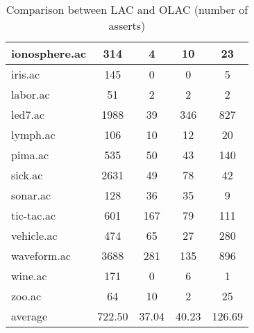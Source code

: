 \begin{table}[htbp]
\begin{tabular}{|l|c|c|c|c|}
		\hline
		ionosphere.ac   & 314           & 4                  & 10                       & 23                            \\
		\hline
		iris.ac         & 145           & 0                  & 0                        & 5                             \\
		\hline
		labor.ac        & 51            & 2                  & 2                        & 2                             \\
		\hline
		led7.ac         & 1988          & 39                 & 346                      & 827                           \\
		\hline
		lymph.ac        & 106           & 10                 & 12                       & 20                            \\
		\hline
		pima.ac         & 535           & 50                 & 43                       & 140                           \\
		\hline
		sick.ac         & 2631          & 49                 & 78                       & 42                            \\
		\hline
		sonar.ac        & 128           & 36                 & 35                       & 9                             \\
		\hline
		tic-tac.ac      & 601           & 167                & 79                       & 111                           \\
		\hline
		vehicle.ac      & 474           & 65                 & 27                       & 280                           \\
		\hline
		waveform.ac     & 3688          & 281                & 135                      & 896                           \\
		\hline
		wine.ac         & 171           & 0                  & 6                        & 1                             \\
		\hline
		zoo.ac          & 64            & 10                 & 2                        & 25                            \\
		\hline
		average         & 722.50        & 37.04              & 40.23                    & 126.69                        \\
		\hline
		\end{tabular}
	\caption{Comparison between LAC and OLAC (number of asserts)}
	\label{tab:comparison_lac_olac}
\end{table}